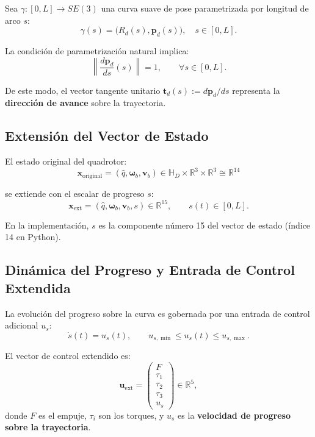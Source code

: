 \documentclass[11pt,a4paper]{article}
\begin{document}
Sea $\gamma : [0, L]\to SE(3)$ una curva suave de pose parametrizada por longitud de arco $s$:
\begin{equation}
    \gamma(s) = \big(R_d(s), \mathbf{p}_d(s)\big), \quad s \in [0, L].
\end{equation}

La condición de parametrización natural implica:
\begin{equation}
    \left\| \frac{d \mathbf{p}_d}{d s}(s) \right\| = 1, \qquad \forall s \in [0,L].
    \label{eq:arc_param}
\end{equation}

De este modo, el vector tangente unitario $\mathbf{t}_d(s) := d\mathbf{p}_d / ds$ representa la \textbf{dirección de avance} sobre la trayectoria.

\subsection{Extensión del Vector de Estado}

El estado original del quadrotor:
\begin{equation}
    \mathbf{x}_{\text{original}} = (\hat{q}, \boldsymbol{\omega}_b, \mathbf{v}_b) \in \mathbb{H}_D \times \mathbb{R}^3 \times \mathbb{R}^3 \cong \mathbb{R}^{14}
\end{equation}

se extiende con el escalar de progreso $s$:
\begin{equation}
    \mathbf{x}_{\text{ext}} = (\hat{q}, \boldsymbol{\omega}_b, \mathbf{v}_b, s) \in \mathbb{R}^{15}, \qquad s(t) \in [0, L].
\end{equation}

En la implementación, $s$ es la componente número 15 del vector de estado (índice 14 en Python).

\subsection{Dinámica del Progreso y Entrada de Control Extendida}

La evolución del progreso sobre la curva es gobernada por una entrada de control adicional $u_s$:
\begin{equation}
    \boxed{\dot{s}(t) = u_s(t)}, \qquad u_{s,\min} \leq u_s(t) \leq u_{s,\max}.
    \label{eq:s_dynamics}
\end{equation}

El vector de control extendido es:
\begin{equation}
    \mathbf{u}_{\text{ext}} = \begin{pmatrix}F \\ \tau_1 \\ \tau_2 \\ \tau_3 \\ u_s\end{pmatrix} \in \mathbb{R}^5,
\end{equation}
donde $F$ es el empuje, $\tau_i$ son los torques, y $u_s$ es la \textbf{velocidad de progreso sobre la trayectoria}.
\end{document}
